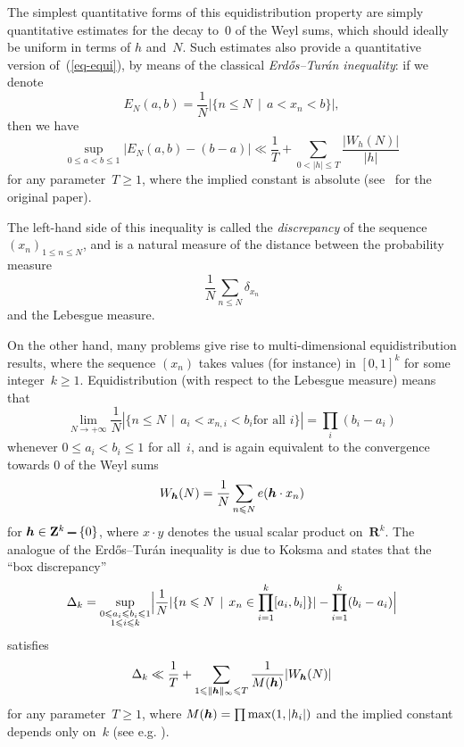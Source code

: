 \documentclass[12pt]{amsart}
\def\setminus{\mathchoice
	{\mathbin{\vrule height .62ex width 1.61ex depth -.38ex}}%
	{\mathbin{\vrule height .62ex width 1.61ex depth -.38ex}}%
	{\mathbin{\vrule height .50ex width 0.85ex depth -.28ex}}%
	{\mathbin{\vrule height .20ex width 0.570ex depth -.24ex}}%
}
\renewcommand{\leq}{\leqslant}
\renewcommand{\geq}{\geqslant}
\newcommand{\uple}[1]{\text{\boldmath${#1}$}}
\newcommand{\Zz}{\mathbf{Z}}
\newcommand{\Rr}{\mathbf{R}}
\theoremstyle{plain}
\theoremstyle{remark}
\theoremstyle{definition}
\renewcommand{\geq}{\geqslant}
\renewcommand{\leq}{\leqslant}
\begin{document}
The simplest quantitative forms of this equidistribution property are
simply quantitative estimates for the decay to~$0$ of the Weyl sums,
which should ideally be uniform in terms of $h$ and~$N$. Such
estimates also provide a quantitative version of~(\ref{eq-equi}), by
means of the classical \emph{Erd\H os--Turán inequality}: if we denote
\[
  E_N(a,b)=\frac{1}{N} |\{n\leq N\,\mid\, a<x_n<b\}|,
\]
then we have
\[
  \sup_{0\leq a<b\leq 1}|E_N(a,b)-(b-a)|\ll
  \frac{1}{T}+\sum_{0<|h|\leq T} \frac{|W_h(N)|}{|h|}
\]
for any parameter~$T\geq 1$, where the implied constant is absolute
(see~\cite[Th.\,III]{erdos-turan} for the original paper).

The left-hand side of this inequality is called the \emph{discrepancy}
of the sequence $(x_n)_{1\leq n\leq N}$, and is a natural measure of the
distance between the probability measure
\[
  \frac{1}{N}\sum_{n\leq N}\delta_{x_n}
\]
and the Lebesgue measure.

On the other hand, many problems give rise to multi-dimensional
equidistribution results, where the sequence $(x_n)$ takes values (for
instance) in $[0,1]^k$ for some integer~$k\geq 1$. Equidistribution
(with respect to the Lebesgue measure) means that
\[
  \lim_{N\to+\infty}\frac{1}{N} |\{n\leq N\,\mid\, a_i<x_{n,i}<b_i\text{
    for all } i\}|= \prod_i(b_i-a_i)
\]
whenever $0\leq a_i<b_i\leq 1$ for all~$i$, and is again equivalent to
the convergence towards $0$ of the Weyl sums
\[
  W_{\uple{h}}(N)=\frac{1}{N}\sum_{n\leq N}e(\uple{h}\cdot x_n)
\]
for $\uple{h}\in\Zz^k \setminus \{0\}$, where $x\cdot y$ denotes the
usual scalar product on~$\Rr^k$. The analogue of the Erd\H os--Turán
inequality is due to Koksma and states that the \enquote{box
  discrepancy}
\[
  \Delta_k=\sup_{\substack{0\leq a_i\leq b_i\leq 1\\1\leq i\leq k}}
  \Bigl| \frac{1}{N}|\{n\leq N\,\mid\, x_{n}\in
  \prod_{i=1}^k[a_i,b_i]\}| -\prod_{i=1}^k(b_i-a_i) \Bigr|
\]
satisfies
\begin{equation}\label{eq-erdos-turan-general}
  \Delta_k
  \ll \frac{1}{T}+\sum_{1\leq \|\uple{h}\|_{\infty}\leq T}
  \frac{1}{M(\uple{h})}|W_{\uple{h}}(N)|
\end{equation}
for any parameter~$T\geq 1$, where $M(\uple{h})=\prod\max(1,|h_i|)$ and
the implied constant depends only on~$k$ (see e.g.
\cite[Th. 1.21]{dt}).
\end{document}
